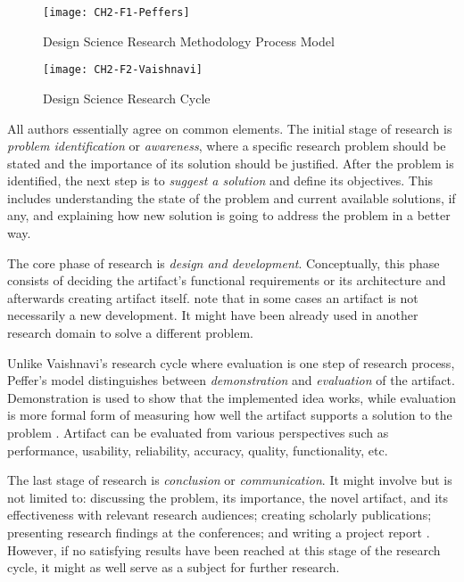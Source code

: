 \begin{figure}[h!]
\centering
\texttt{[image: CH2-F1-Peffers]}
\caption[Design Science Research Methodology Process Model]{Design Science
Research Methodology Process Model \citep{Peffers2008}}
\label{fig:peffers}
\end{figure}

\FloatBarrier

\begin{figure}[htp]
\centering
\texttt{[image: CH2-F2-Vaishnavi]}
\caption[Design Science Reseach Cycle]{Design Science Research Cycle
\citep{Vaishnavi2007}}
\label{fig:vaishnavi}
\end{figure}

All authors essentially agree on common elements. The initial stage of research
is \textit{problem identification} or \textit{awareness}, where a specific
research problem should be stated and the importance of its solution should be
justified. After the problem is identified, the next step is to \textit{suggest
a solution} and define its objectives. This includes understanding the state of
the problem and current available solutions, if any, and explaining how new
solution is going to address the problem in a better way. 

\FloatBarrier

The core phase of research is \textit{design and development}. Conceptually,
this phase consists of deciding the artifact's functional requirements or its
architecture and afterwards creating artifact itself. \citet{Peffers2008} note
that in some cases an artifact is not necessarily a new development. It might
have been already used in another research domain to solve a different problem.

Unlike Vaishnavi's research cycle where evaluation is one step of research
process, Peffer's model distinguishes between \textit{demonstration} and
\textit{evaluation} of the artifact. Demonstration is used to show that the
implemented idea works, while evaluation is more formal form of measuring how
well the artifact supports a solution to the problem \citep{Peffers2008}.
Artifact can be evaluated from various perspectives such as performance,
usability, reliability, accuracy, quality, functionality, etc.

The last stage of research is \textit{conclusion} or \textit{communication}. It
might involve but is not limited to: discussing the problem, its importance, the
novel artifact, and its effectiveness with relevant research audiences; creating
scholarly publications; presenting research findings at the conferences; and
writing a project report \citep{Archer1984}. However, if no satisfying results
have been reached at this stage of the research cycle, it might as well serve as
a subject for further research.

